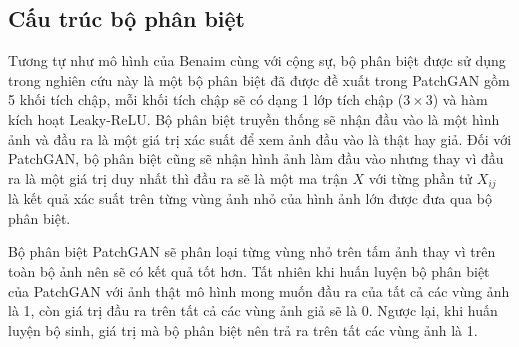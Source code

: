 \documentclass[12pt]{report}%
\begin{document}


\subsection{Cấu trúc bộ phân biệt}
Tương tự như mô hình của  Benaim cùng với cộng sự,  bộ phân biệt được sử dụng trong nghiên cứu này là một bộ phân biệt đã được đề xuất trong PatchGAN \cite{isola2017image} gồm 5 khối tích chập, mỗi khối tích chập sẽ có dạng 1 lớp tích chập ($3\times 3$) và hàm kích hoạt Leaky-ReLU.  Bộ phân biệt truyền thống sẽ nhận đầu vào là một hình ảnh và đầu ra là một giá trị xác suất để xem ảnh đầu vào là thật hay giả. Đối với PatchGAN, bộ phân biệt  cũng sẽ nhận hình ảnh làm đầu vào nhưng thay vì đầu ra là một giá trị duy nhất thì đầu ra sẽ là một ma trận $X$ với từng phần tử $X_{ij}$ là kết quả xác suất trên từng vùng ảnh nhỏ của hình ảnh lớn được đưa qua bộ phân biệt.

Bộ phân biệt PatchGAN sẽ phân loại từng vùng nhỏ trên tấm ảnh thay vì trên toàn bộ ảnh nên sẽ có kết quả tốt hơn. Tất nhiên khi huấn luyện bộ phân biệt của PatchGAN với ảnh thật mô hình mong muốn đầu ra của tất cả các vùng ảnh là 1, còn giá trị đầu ra trên tất cả các vùng ảnh giả sẽ là 0. Ngược lại, khi huấn luyện bộ sinh, giá trị mà bộ phân biệt nên trả ra  trên tất các vùng ảnh là 1.
\end{document}
